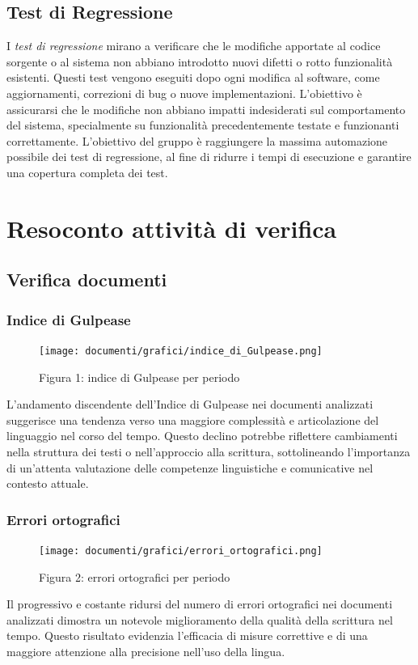 \documentclass{article}
\begin{document}
\subsection{Test di Regressione}
I \textit{test di regressione} mirano a verificare che le modifiche apportate al codice sorgente o al sistema non abbiano introdotto nuovi difetti o rotto funzionalità esistenti. Questi test vengono eseguiti dopo ogni modifica al software, come aggiornamenti, correzioni di bug o nuove implementazioni. L'obiettivo è assicurarsi che le modifiche non abbiano impatti indesiderati sul comportamento del sistema, specialmente su funzionalità precedentemente testate e funzionanti correttamente. L'obiettivo del gruppo è raggiungere la massima automazione possibile dei test di regressione, al fine di ridurre i tempi di esecuzione e garantire una copertura completa dei test.


\section{Resoconto attività di verifica}
\subsection{Verifica documenti}
\subsubsection{Indice di Gulpease}

    \begin{figure}[H]
    \centering
    \texttt{[image: documenti/grafici/indice\_di\_Gulpease.png]}
     \caption{Figura 1: indice di Gulpease per periodo}
    \end{figure}

    L'andamento discendente dell'Indice di Gulpease nei documenti analizzati suggerisce una tendenza verso una maggiore complessità e articolazione del linguaggio nel corso del tempo. Questo declino potrebbe riflettere cambiamenti nella struttura dei testi o nell'approccio alla scrittura, sottolineando l'importanza di un'attenta valutazione delle competenze linguistiche e comunicative nel contesto attuale.



\subsubsection{Errori ortografici}
   \begin{figure}[H]
    \centering
    \texttt{[image: documenti/grafici/errori\_ortografici.png]}
     \caption{Figura 2: errori ortografici per periodo}
    \end{figure}
     Il progressivo e costante ridursi del numero di errori ortografici nei documenti analizzati dimostra un notevole miglioramento della qualità della scrittura nel tempo. Questo risultato evidenzia l'efficacia di misure correttive e di una maggiore attenzione alla precisione nell'uso della lingua.
\end{document}
